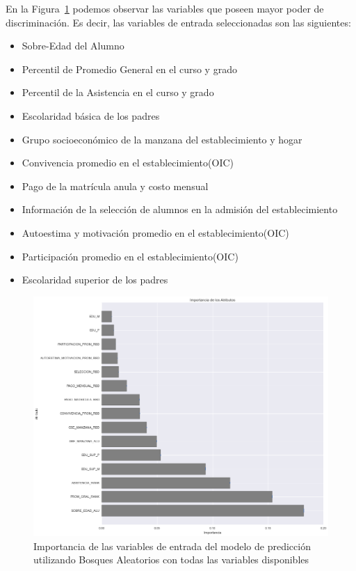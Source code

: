 En la Figura~\ref{fig:impo-total1} podemos observar las variables que poseen mayor poder de discriminación. Es decir, las variables de entrada seleccionadas son las siguientes:\\
\begin{itemize}
\item Sobre-Edad del Alumno
\item Percentil de Promedio General en el curso y grado
\item Percentil de la Asistencia en el curso y grado
\item Escolaridad básica de los padres
\item Grupo socioeconómico de la manzana del establecimiento y hogar
\item Convivencia promedio en el establecimiento(OIC)
\item Pago de la matrícula anula y costo mensual
\item Información de la selección de alumnos en la admisión del establecimiento
\item Autoestima y motivación promedio en el establecimiento(OIC)
\item Participación promedio en el establecimiento(OIC)
\item Escolaridad superior de los padres
\end{itemize}
\begin{figure}[H]
  \centering
    \includegraphics[trim=0cm 0cm 0cm 0cm,scale=0.4]{Figuras/7AnalisisResultado/impo-total.png}
      \caption{Importancia de las variables de entrada del modelo de predicción utilizando Bosques Aleatorios con todas las variables disponibles}
    \label{fig:impo-total1}
\end{figure}
